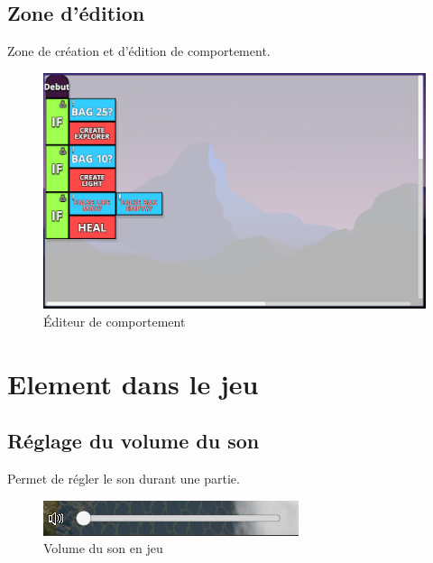 \documentclass{report}
\begin{document}
\subsection{Zone d'édition}
Zone de création et d’édition de comportement.
\begin{figure}[!h]
	\centering
		\includegraphics[scale=0.40]{Editeur}
	\caption{Éditeur de comportement}
\end{figure}


\section{Element dans le jeu}
\subsection{Réglage du volume du son}
Permet de régler le son durant une partie.
\begin{figure}[!h]
	\centering
		\includegraphics[scale=0.80]{SoundIG}
	\caption{Volume du son en jeu}
\end{figure}
\end{document}
